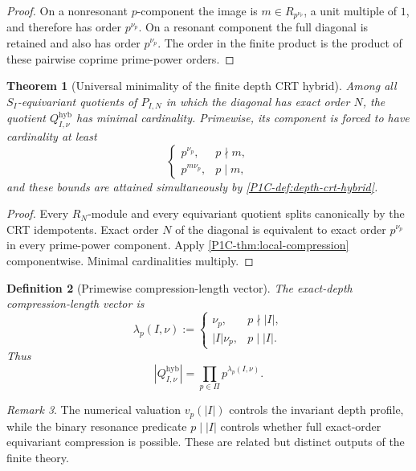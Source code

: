 \documentclass[11pt]{article}
\newtheorem{theorem}{Theorem}[section]
\newtheorem{definition}[theorem]{Definition}
\theoremstyle{remark}
\newtheorem{remark}[theorem]{Remark}
\begin{document}
\begin{proof}
On a nonresonant \(p\)-component the image is \(m\in R_{p^{\nu_p}}\), a unit multiple of \(1\), and therefore has order \(p^{\nu_p}\).  On a resonant component the full diagonal is retained and also has order \(p^{\nu_p}\).  The order in the finite product is the product of these pairwise coprime prime-power orders.
\end{proof}

\begin{theorem}[Universal minimality of the finite depth CRT hybrid]\label{P1C-thm:crt-minimality}
Among all \(S_I\)-equivariant quotients of \(P_{I,N}\) in which the diagonal has exact order \(N\), the quotient \(Q_{I,\nu}^{\mathrm{hyb}}\) has minimal cardinality.  Primewise, its component is forced to have cardinality at least
\[
 \begin{cases}
 p^{\nu_p},&p\nmid m,\\
 p^{m\nu_p},&p\mid m,
 \end{cases}
\]
and these bounds are attained simultaneously by \cref{P1C-def:depth-crt-hybrid}.
\end{theorem}

\begin{proof}
Every \(R_N\)-module and every equivariant quotient splits canonically by the CRT idempotents.  Exact order \(N\) of the diagonal is equivalent to exact order \(p^{\nu_p}\) in every prime-power component.  Apply \cref{P1C-thm:local-compression} componentwise.  Minimal cardinalities multiply.
\end{proof}

\begin{definition}[Primewise compression-length vector]
The exact-depth compression-length vector is
\[
 \boxed{
 \lambda_{p}(I,\nu):=
 \begin{cases}
 \nu_p,&p\nmid |I|,\\
 |I|\nu_p,&p\mid |I|.
 \end{cases}}
\]
Thus
\[
 |Q_{I,\nu}^{\mathrm{hyb}}|
 =\prod_{p\in\Pi}p^{\lambda_p(I,\nu)}.
\]
\end{definition}

\begin{remark}
The numerical valuation \(v_p(|I|)\) controls the invariant depth profile, while the binary resonance predicate \(p\mid |I|\) controls whether full exact-order equivariant compression is possible.  These are related but distinct outputs of the finite theory.
\end{remark}
\end{document}
